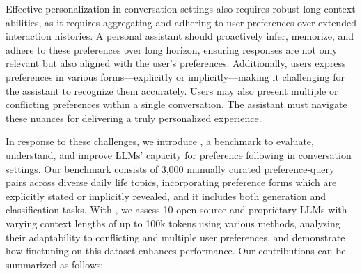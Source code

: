 
Effective personalization in conversation settings also requires robust long-context abilities, as it requires aggregating and adhering to user preferences over extended interaction histories. A personal assistant should proactively infer, memorize, and adhere to these preferences over long horizon, ensuring responses are not only relevant but also aligned with the user’s preferences. Additionally, users express preferences in various forms—explicitly or implicitly—making it challenging for the assistant to recognize them accurately. Users may also present multiple or conflicting preferences within a single conversation. The assistant must navigate these nuances for delivering a truly personalized experience.


In response to these challenges, we introduce \ours{}, a benchmark to evaluate, understand, and improve LLMs' capacity for preference following in conversation settings. Our benchmark consists of 3,000 manually curated preference-query pairs across diverse daily life topics, incorporating preference forms which are explicitly stated or implicitly revealed, and it includes both generation and classification tasks. With \ours{}, we assess 10 open-source and proprietary LLMs with varying context lengths of up to 100k tokens using various methods, analyzing their adaptability to conflicting and multiple user preferences, and demonstrate how finetuning on this dataset enhances performance. Our contributions can be summarized as follows:
